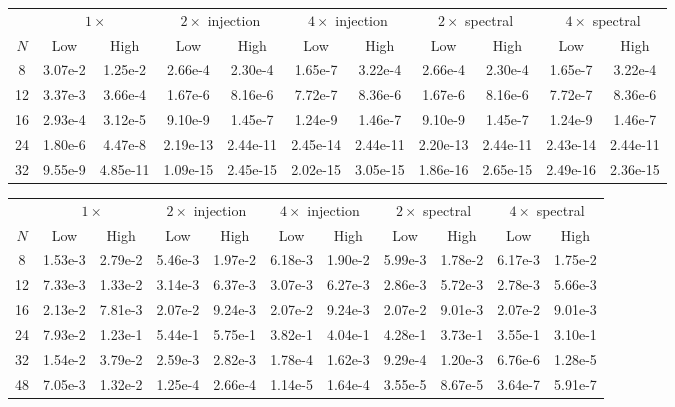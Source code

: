 \begin{table}[htpb]
\centering
\begin{tabular}{c|cc|cc|cc|cc|cc|}
 & \multicolumn{2}{c|}{$1 \times$} 
 & \multicolumn{2}{c|}{$2 \times$ \: injection}
 & \multicolumn{2}{c|}{$4 \times$ \: injection}
 & \multicolumn{2}{c|}{$2 \times$ \: spectral}
 & \multicolumn{2}{c|}{$4 \times$ \: spectral} \\
 $N$ & Low & High & Low & High & Low & High & Low & High & Low & High \\
 \hline
 8  & 3.07e-2 & 1.25e-2
    & 2.66e-4 & 2.30e-4
    & 1.65e-7 & 3.22e-4
    & 2.66e-4 & 2.30e-4
    & 1.65e-7 & 3.22e-4
    \\
 12 & 3.37e-3 & 3.66e-4
    & 1.67e-6 & 8.16e-6
    & 7.72e-7 & 8.36e-6
    & 1.67e-6 & 8.16e-6
    & 7.72e-7 & 8.36e-6
    \\
 16 & 2.93e-4 & 3.12e-5
    & 9.10e-9 & 1.45e-7
    & 1.24e-9 & 1.46e-7
    & 9.10e-9 & 1.45e-7
    & 1.24e-9 & 1.46e-7
    \\
 24 & 1.80e-6 & 4.47e-8
    & 2.19e-13 & 2.44e-11
    & 2.45e-14 & 2.44e-11
    & 2.20e-13 & 2.44e-11
    & 2.43e-14 & 2.44e-11
    \\
 32 & 9.55e-9 & 4.85e-11
    & 1.09e-15 & 2.45e-15
    & 2.02e-15 & 3.05e-15
    & 1.86e-16 & 2.65e-15
    & 2.49e-16 & 2.36e-15
\end{tabular}

\begin{tabular}{c|cc|cc|cc|cc|cc|}
 & \multicolumn{2}{c|}{$1 \times$} 
 & \multicolumn{2}{c|}{$2 \times$ \: injection}
 & \multicolumn{2}{c|}{$4 \times$ \: injection}
 & \multicolumn{2}{c|}{$2 \times$ \: spectral}
 & \multicolumn{2}{c|}{$4 \times$ \: spectral} \\
 $N$ & Low & High & Low & High & Low & High & Low & High & Low & High \\
 \hline
 8  & 1.53e-3 & 2.79e-2
    & 5.46e-3 & 1.97e-2
    & 6.18e-3 & 1.90e-2
    & 5.99e-3 & 1.78e-2
    & 6.17e-3 & 1.75e-2
    \\
 12 & 7.33e-3 & 1.33e-2
    & 3.14e-3 & 6.37e-3
    & 3.07e-3 & 6.27e-3
    & 2.86e-3 & 5.72e-3
    & 2.78e-3 & 5.66e-3
    \\
 16 & 2.13e-2 & 7.81e-3
    & 2.07e-2 & 9.24e-3
    & 2.07e-2 & 9.24e-3
    & 2.07e-2 & 9.01e-3
    & 2.07e-2 & 9.01e-3
    \\
 24 & 7.93e-2 & 1.23e-1
    & 5.44e-1 & 5.75e-1
    & 3.82e-1 & 4.04e-1
    & 4.28e-1 & 3.73e-1
    & 3.55e-1 & 3.10e-1
    \\
 32 & 1.54e-2 & 3.79e-2
    & 2.59e-3 & 2.82e-3
    & 1.78e-4 & 1.62e-3
    & 9.29e-4 & 1.20e-3
    & 6.76e-6 & 1.28e-5
    \\
 48 & 7.05e-3 & 1.32e-2
    & 1.25e-4 & 2.66e-4
    & 1.14e-5 & 1.64e-4
    & 3.55e-5 & 8.67e-5
    & 3.64e-7 & 5.91e-7
\end{tabular}


\end{table}
